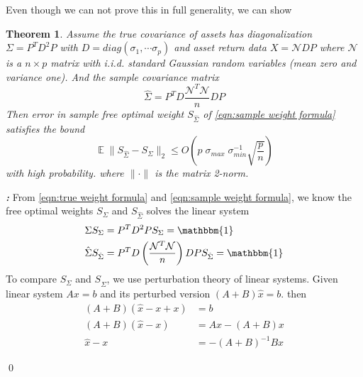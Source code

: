 \documentclass[12pt]{extarticle}
\newtheorem{theorem}{Theorem}
\renewenvironment{proof}[1][\proofname]{ { \it\bfseries #1: }}{\qed}
\newcommand{\cN}{{\mathcal{N}}}
\newcommand{\1}{\mathbbm{1}}
\DeclareMathOperator{\E}{\mathbb{E}}
\numberwithin{equation}{section}
\begin{document}
Even though we can not prove this in  full generality, we can show 
\begin{theorem}
Assume the true covariance of assets has diagonalization $\Sigma=P^TD^2P$ with $D= diag (\sigma_1,\cdots \sigma_p)$ and asset return data $X= \cN DP$ where $\cN$ is a $n\times p$ matrix with i.i.d. standard  Gaussian random variables (mean zero and variance one).  And the sample covariance matrix 
\[
\hat{\Sigma} = P^T D\frac{\cN^T\cN}{n} D P
\]
Then error in sample free optimal weight $S_{\hat{\Sigma}}$ of \ref{eqn:sample weight formula} satisfies the bound
\[
\E \|S_{\hat{\Sigma}} - S_{{\Sigma}}\|_2 \le  O\left( p \; \sigma_{max}\; \sigma_{min}^{-1}  \sqrt{\frac{p}{n}} \right)
\]
with high probability. where $\| \cdot \|$ is the matrix 2-norm.
\end{theorem}
\begin{proof}
From \ref{eqn:true weight formula} and \ref{eqn:sample weight formula}, we know the free optimal weights $S_{\Sigma}$ and $S_{\hat{\Sigma}}$  solves the linear system 
\begin{align*}
     \Sigma S_{\Sigma} & = P^T D^{2}P S_{\Sigma} =  \1  \\
     {\hat{\Sigma}} S_{\hat{\Sigma}} & = P^T D \left( \frac{\cN^T\cN}{n}\right) DP S_{\hat{\Sigma}}   =  \1 
\end{align*}
To compare $S_{\Sigma}$ and $S_{\hat{\Sigma}}$, we use perturbation theory of linear systems. 
Given linear system $Ax=b$ and its perturbed version $(A+B) \hat{x} =b$. then \begin{align*}
    (A+B)(\hat{x}-x +x) & = b \\
    (A+B)(\hat{x}-x) & = Ax- (A+B)x \\
    \hat{x}- x &= -(A+B)^{-1}Bx
\end{align*}


\end{proof}
\end{document}
